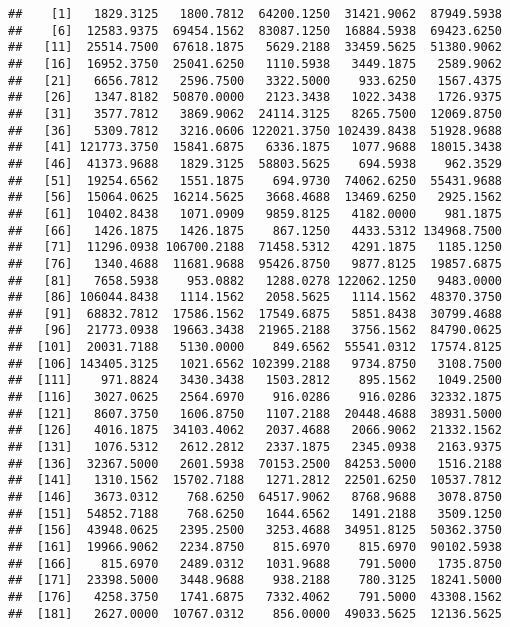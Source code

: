 \documentclass[]{article}
\begin{document}
\begin{verbatim}
##    [1]   1829.3125   1800.7812  64200.1250  31421.9062  87949.5938
##    [6]  12583.9375  69454.1562  83087.1250  16884.5938  69423.6250
##   [11]  25514.7500  67618.1875   5629.2188  33459.5625  51380.9062
##   [16]  16952.3750  25041.6250   1110.5938   3449.1875   2589.9062
##   [21]   6656.7812   2596.7500   3322.5000    933.6250   1567.4375
##   [26]   1347.8182  50870.0000   2123.3438   1022.3438   1726.9375
##   [31]   3577.7812   3869.9062  24114.3125   8265.7500  12069.8750
##   [36]   5309.7812   3216.0606 122021.3750 102439.8438  51928.9688
##   [41] 121773.3750  15841.6875   6336.1875   1077.9688  18015.3438
##   [46]  41373.9688   1829.3125  58803.5625    694.5938    962.3529
##   [51]  19254.6562   1551.1875    694.9730  74062.6250  55431.9688
##   [56]  15064.0625  16214.5625   3668.4688  13469.6250   2925.1562
##   [61]  10402.8438   1071.0909   9859.8125   4182.0000    981.1875
##   [66]   1426.1875   1426.1875    867.1250   4433.5312 134968.7500
##   [71]  11296.0938 106700.2188  71458.5312   4291.1875   1185.1250
##   [76]   1340.4688  11681.9688  95426.8750   9877.8125  19857.6875
##   [81]   7658.5938    953.0882   1288.0278 122062.1250   9483.0000
##   [86] 106044.8438   1114.1562   2058.5625   1114.1562  48370.3750
##   [91]  68832.7812  17586.1562  17549.6875   5851.8438  30799.4688
##   [96]  21773.0938  19663.3438  21965.2188   3756.1562  84790.0625
##  [101]  20031.7188   5130.0000    849.6562  55541.0312  17574.8125
##  [106] 143405.3125   1021.6562 102399.2188   9734.8750   3108.7500
##  [111]    971.8824   3430.3438   1503.2812    895.1562   1049.2500
##  [116]   3027.0625   2564.6970    916.0286    916.0286  32332.1875
##  [121]   8607.3750   1606.8750   1107.2188  20448.4688  38931.5000
##  [126]   4016.1875  34103.4062   2037.4688   2066.9062  21332.1562
##  [131]   1076.5312   2612.2812   2337.1875   2345.0938   2163.9375
##  [136]  32367.5000   2601.5938  70153.2500  84253.5000   1516.2188
##  [141]   1310.1562  15702.7188   1271.2812  22501.6250  10537.7812
##  [146]   3673.0312    768.6250  64517.9062   8768.9688   3078.8750
##  [151]  54852.7188    768.6250   1644.6562   1491.2188   3509.1250
##  [156]  43948.0625   2395.2500   3253.4688  34951.8125  50362.3750
##  [161]  19966.9062   2234.8750    815.6970    815.6970  90102.5938
##  [166]    815.6970   2489.0312   1031.9688    791.5000   1735.8750
##  [171]  23398.5000   3448.9688    938.2188    780.3125  18241.5000
##  [176]   4258.3750   1741.6875   7332.4062    791.5000  43308.1562
##  [181]   2627.0000  10767.0312    856.0000  49033.5625  12136.5625

\end{verbatim}
\end{document}

